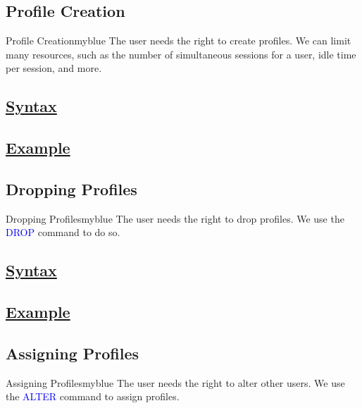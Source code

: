 \vspace{0.25cm}
\subsection{Profile Creation}
\begin{prettyBox}{Profile Creation}{myblue} The user needs the right to create
profiles. We can limit many resources, such as the number of simultaneous 
sessions for a user, idle time per session, and more. 
\end{prettyBox}

\vspace{0.15cm}
\subsection*{\underline{Syntax}} 


\vspace{0.15cm}
\subsection*{\underline{Example}} 



\vspace{0.25cm}
\subsection{Dropping Profiles}
\begin{prettyBox}{Dropping Profiles}{myblue} The user needs the right to 
drop profiles. We use the \textcolor{blue}{DROP} command to do so.
\end{prettyBox}

\vspace{0.15cm}
\subsection*{\underline{Syntax}}


\vspace{0.15cm}
\subsection*{\underline{Example}}



\vspace{0.25cm}
\subsection{Assigning Profiles} 
\begin{prettyBox}{Assigning Profiles}{myblue} 
The user needs the right to alter other users. We use the 
\textcolor{blue}{ALTER} command to assign profiles.
\end{prettyBox}

